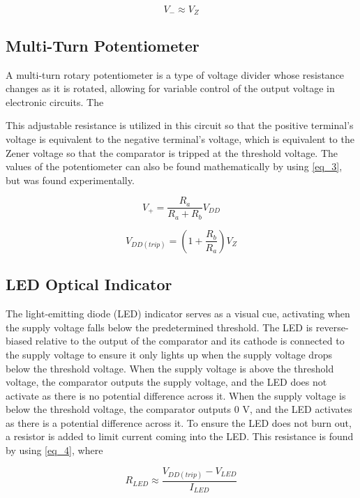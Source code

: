 \documentclass[conference]{IEEEtran}
\begin{document}
\begin{equation}
V_- \approx V_Z\label{eq_1}
\end{equation}


\subsection{Multi-Turn Potentiometer}

A multi-turn rotary potentiometer is a type of voltage divider whose resistance changes as it is rotated, allowing for variable control of the output voltage in electronic circuits. The 

This adjustable resistance is utilized in this circuit so that the positive terminal's voltage is equivalent to the negative terminal's voltage, which is equivalent to the Zener voltage so that the comparator is tripped at the threshold voltage. The values of the potentiometer can also be found mathematically by using \eqref{eq_3}, but was found experimentally.

\begin{equation}
V_+ = \frac{R_a}{R_a + R_b} V_{DD}\label{eq_2}
\end{equation}

\begin{equation}
V_{DD(trip)} = (1 + \frac{R_b}{R_a})V_{Z}\label{eq_3}
\end{equation}

\subsection{LED Optical Indicator}

The light-emitting diode (LED) indicator serves as a visual cue, activating when the supply voltage falls below the predetermined threshold. The LED is reverse-biased relative to the output of the comparator and its cathode is connected to the supply voltage to ensure it only lights up when the supply voltage drops below the threshold voltage. When the supply voltage is above the threshold voltage, the comparator outputs the supply voltage, and the LED does not activate as there is no potential difference across it. When the supply voltage is below the threshold voltage, the comparator outputs 0 V, and the LED activates as there is a potential difference across it. To ensure the LED does not burn out, a resistor is added to limit current coming into the LED. This resistance is found by using \eqref{eq_4}, where 

\begin{equation}
R_{LED} \approx \frac{V_{DD(trip)} - V_{LED}}{I_{LED}}\label{eq_4}
\end{equation}
\end{document}
